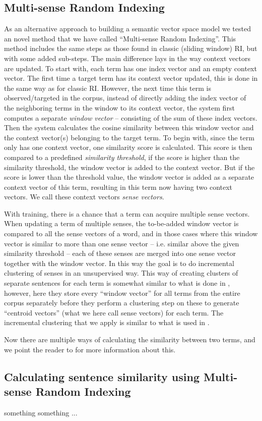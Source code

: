 \subsection{Multi-sense Random Indexing}

As an alternative approach to building a semantic vector space model we tested an novel method that we have called ``Multi-sense Random Indexing''.
This method includes the same steps as those found in classic (sliding window) RI, but with some added sub-steps. 
The main difference lays in the way context vectors are updated.
To start with, each term has one index vector and an empty context vector.
The first time a target term has its context vector updated, this is done in the same way as for classic RI.
However, the next time this term is observed/targeted in the corpus, instead of directly adding the index vector of the neighboring terms in the window to its context vector, the system first computes a separate \emph{window vector} -- consisting of the sum of these index vectors.
Then the system calculates the cosine similarity between this window vector and the context vector(s) belonging to the target term. 
To begin with, since the term only has one context vector, one similarity score is calculated.
This score is then compared to a predefined \emph{similarity threshold}, if the score is higher than the similarity threshold, the window vector is added to the context vector. But if the score is lower than the threshold value, the window vector is added as a separate context vector of this term, resulting in this term now having two context vectors. We call these context vectors \emph{sense vectors}.

With training, there is a chance that a term can acquire multiple sense vectors. 
When updating a term of multiple senses, the to-be-added window vector is compared to all the sense vectors of a word, and in those cases where this window vector is similar to more than one sense vector -- i.e. similar above the given similarity threshold -- each of these senses are merged into one sense vector together with the window vector. In this way the goal is to do incremental clustering of senses in an unsupervised way. This way of creating clusters of separate sentences for each term is somewhat similar to what is done in \cite{ sense clustering paper ...  }, however, here they store every ``window vector'' for all terms from the entire corpus separately before they perform a clustering step on these to generate ``centroid vectors'' (what we here call sense vectors) for each term. The incremental clustering that we apply is similar to what is used in \cite{ IBM? paper om incremental clustering}.

Now there are multiple ways of calculating the similarity between two terms, and we point the reader to \cite{ sense clustering paper ...  } for more information about this.

\subsection{Calculating sentence similarity using Multi-sense Random Indexing}
something something ...